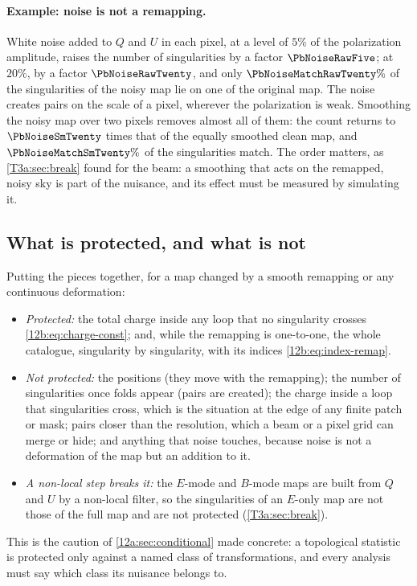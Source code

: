 \paragraph{Example: noise is not a remapping.} White noise added to $Q$ and $U$ in each pixel, at a level of
$5\%$ of the polarization amplitude, raises the number of singularities by a factor $\PbNoiseRawFive$; at $20\%$, by a
factor $\PbNoiseRawTwenty$, and only $\PbNoiseMatchRawTwenty\%$ of the singularities of the noisy map lie on one of the
original map. The noise creates pairs on the scale of a pixel, wherever the polarization is weak. Smoothing the noisy map
over two pixels removes almost all of them: the count returns to $\PbNoiseSmTwenty$ times that of the equally smoothed
clean map, and $\PbNoiseMatchSmTwenty\%$ of the singularities match. The order matters, as \cref{T3a:sec:break} found
for the beam: a smoothing that acts on the remapped, noisy sky is part of the nuisance, and its effect must be measured by
simulating it.

\subsection{What is protected, and what is not}
\label{12b:sec:caveats}

Putting the pieces together, for a map changed by a smooth remapping or any continuous deformation:
\begin{itemize}[itemsep=1pt,leftmargin=1.2em]
  \item \emph{Protected:} the total charge inside any loop that no singularity crosses \eqref{12b:eq:charge-const}; and,
        while the remapping is one-to-one, the whole catalogue, singularity by singularity, with its indices
        \eqref{12b:eq:index-remap}.
  \item \emph{Not protected:} the positions (they move with the remapping); the number of singularities once folds
        appear (pairs are created); the charge inside a loop that singularities cross, which is the situation at the
        edge of any finite patch or mask; pairs closer than the resolution, which a beam or a pixel grid can merge or
        hide; and anything that noise touches, because noise is not a deformation of the map but an addition to it.
  \item \emph{A non-local step breaks it:} the $E$-mode and $B$-mode maps are built from $Q$ and $U$ by a non-local
        filter, so the singularities of an $E$-only map are not those of the full map and are not protected
        (\cref{T3a:sec:break}).
\end{itemize}
This is the caution of \cref{12a:sec:conditional} made concrete: a topological statistic is protected only against a
named class of transformations, and every analysis must say which class its nuisance belongs to.
